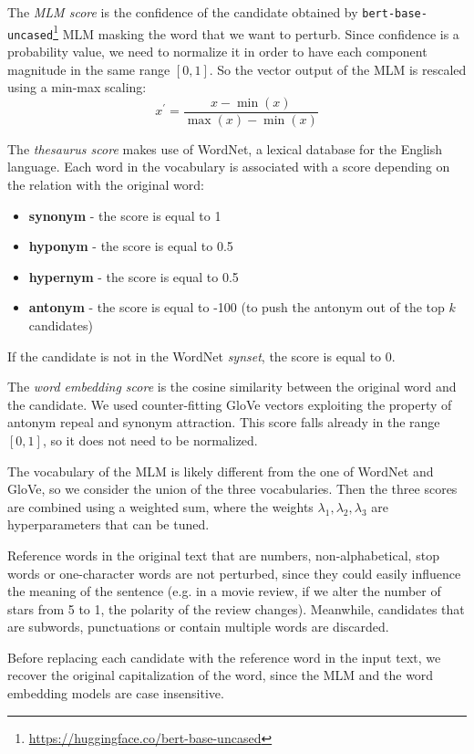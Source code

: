 The \emph{MLM score} is the confidence of the candidate obtained by \texttt{bert-base-uncased}\footnote{\url{https://huggingface.co/bert-base-uncased}} MLM masking the word that we want to perturb.
Since confidence is a probability value, we need to normalize it in order to have each component magnitude in the same range $[0,1]$.
So the vector output of the MLM is rescaled using a min-max scaling:
\begin{equation}
    x^\prime = \frac{x - \min(x)}{\max(x) - \min(x)}
\end{equation}

The \emph{thesaurus score} makes use of WordNet, a lexical database for the English language. Each word in the vocabulary is associated with a score depending on the relation with the original word:
\begin{itemize}
    \item \textbf{synonym} - the score is equal to 1
    \item \textbf{hyponym} - the score is equal to 0.5
    \item \textbf{hypernym} - the score is equal to 0.5
    \item \textbf{antonym} - the score is equal to -100 (to push the antonym out of the top $k$ candidates)
\end{itemize}
If the candidate is not in the WordNet \emph{synset}, the score is equal to 0.

The \emph{word embedding score} is the cosine similarity between the original word and the candidate. We used counter-fitting GloVe vectors \cite{conf/naacl/MrksicSTGRSVWY16} exploiting the property of antonym repeal and synonym attraction. 
This score falls already in the range $[0,1]$, so it does not need to be normalized.

The vocabulary of the MLM is likely different from the one of WordNet and GloVe, so we consider the union of the three vocabularies.
Then the three scores are combined using a weighted sum, where the weights $\lambda_1, \lambda_2, \lambda_3$ are hyperparameters that can be tuned.

Reference words in the original text that are numbers, non-alphabetical, stop words or one-character words are not perturbed, since they could easily influence the meaning of the sentence (e.g. in a movie review, if we alter the number of stars from 5 to 1, the polarity of the review changes).
Meanwhile, candidates that are subwords, punctuations or contain multiple words are discarded.

Before replacing each candidate with the reference word in the input text, we recover the original capitalization of the word, since the MLM and the word embedding models are case insensitive.

